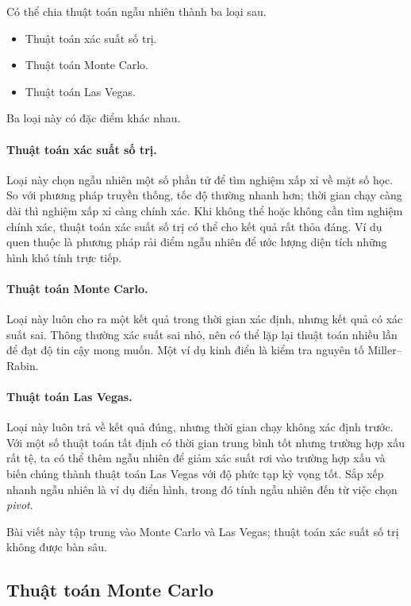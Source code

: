 \documentclass[11pt]{article}
\begin{document}
Có thể chia thuật toán ngẫu nhiên thành ba loại sau.
\begin{itemize}
  \item Thuật toán xác suất số trị.
  \item Thuật toán Monte Carlo.
  \item Thuật toán Las Vegas.
\end{itemize}

Ba loại này có đặc điểm khác nhau.

\paragraph{Thuật toán xác suất số trị.}
Loại này chọn ngẫu nhiên một số phần tử để tìm nghiệm xấp xỉ về mặt số học.
So với phương pháp truyền thống, tốc độ thường nhanh hơn; thời gian chạy càng
dài thì nghiệm xấp xỉ càng chính xác. Khi không thể hoặc không cần tìm nghiệm
chính xác, thuật toán xác suất số trị có thể cho kết quả rất thỏa đáng. Ví dụ
quen thuộc là phương pháp rải điểm ngẫu nhiên để ước lượng diện tích những hình
khó tính trực tiếp.

\paragraph{Thuật toán Monte Carlo.}
Loại này luôn cho ra một kết quả trong thời gian xác định, nhưng kết quả có xác
suất sai. Thông thường xác suất sai nhỏ, nên có thể lặp lại thuật toán nhiều
lần để đạt độ tin cậy mong muốn. Một ví dụ kinh điển là kiểm tra nguyên tố
Miller--Rabin.

\paragraph{Thuật toán Las Vegas.}
Loại này luôn trả về kết quả đúng, nhưng thời gian chạy không xác định trước.
Với một số thuật toán tất định có thời gian trung bình tốt nhưng trường hợp xấu
rất tệ, ta có thể thêm ngẫu nhiên để giảm xác suất rơi vào trường hợp xấu và
biến chúng thành thuật toán Las Vegas với độ phức tạp kỳ vọng tốt. Sắp xếp nhanh
ngẫu nhiên là ví dụ điển hình, trong đó tính ngẫu nhiên đến từ việc chọn
\emph{pivot}.

Bài viết này tập trung vào Monte Carlo và Las Vegas; thuật toán xác suất số trị
không được bàn sâu.

\subsection{Thuật toán Monte Carlo}
\end{document}
